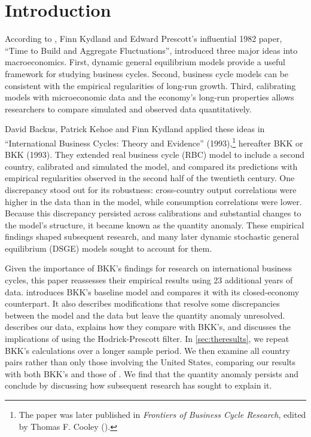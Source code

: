 \section{Introduction}

According to \cite{Rebelo:2005aa}, Finn Kydland and Edward Prescott's influential 1982 paper, ``Time to Build and Aggregate Fluctuations'', introduced three major ideas into macroeconomics. First, dynamic general equilibrium models provide a useful framework for studying business cycles. Second, business cycle models can be consistent with the empirical regularities of long-run growth. Third, calibrating models with microeconomic data and the economy's long-run properties allows researchers to compare simulated and observed data quantitatively.

David Backus, Patrick Kehoe and Finn Kydland applied these ideas in ``International Business Cycles: Theory and Evidence'' (1993),\footnote{The paper was later published in \textit{Frontiers of Business Cycle Research}, edited by Thomas F. Cooley (\cite{:1995aa}).} hereafter BKK or BKK (1993). They extended \cites{Kydland:1982aa} real business cycle (RBC) model to include a second country, calibrated and simulated the model, and compared its predictions with empirical regularities observed in the second half of the twentieth century. One discrepancy stood out for its robustness: cross-country output correlations were higher in the data than in the model, while consumption correlations were lower. Because this discrepancy persisted across calibrations and substantial changes to the model's structure, it became known as the quantity anomaly. These empirical findings shaped subsequent research, and many later dynamic stochastic general equilibrium (DSGE) models sought to account for them.

Given the importance of BKK's findings for research on international business cycles, this paper reassesses their empirical results using 23 additional years of data.  introduces BKK's baseline model and compares it with its closed-economy counterpart. It also describes modifications that resolve some discrepancies between the model and the data but leave the quantity anomaly unresolved.  describes our data, explains how they compare with BKK's, and discusses the implications of using the Hodrick-Prescott filter. In \cref{sec:theresults}, we repeat BKK's calculations over a longer sample period. We then examine all country pairs rather than only those involving the United States, comparing our results with both BKK's and those of \cite{Ambler:2004aa}. We find that the quantity anomaly persists and conclude by discussing how subsequent research has sought to explain it.


